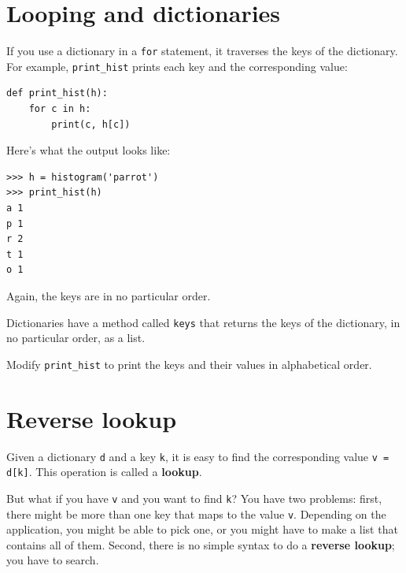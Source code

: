 \documentclass[10pt]{book}
\begin{document}
\section{Looping and dictionaries}


If you use a dictionary in a {\tt for} statement, it traverses
the keys of the dictionary.  For example, \verb"print_hist"
prints each key and the corresponding value:

\beforeverb
\begin{verbatim}
def print_hist(h):
    for c in h:
        print(c, h[c])
\end{verbatim}
\afterverb
%
Here's what the output looks like:

\beforeverb
\begin{verbatim}
>>> h = histogram('parrot')
>>> print_hist(h)
a 1
p 1
r 2
t 1
o 1
\end{verbatim}
\afterverb
%
Again, the keys are in no particular order.

\begin{ex}


Dictionaries have a method called {\tt keys} that returns
the keys of the dictionary, in no particular order, as a list.

Modify \verb"print_hist" to print the keys and their values
in alphabetical order.
\end{ex}



\section{Reverse lookup}


Given a dictionary {\tt d} and a key {\tt k}, it is easy to
find the corresponding value {\tt v = d[k]}.  This operation
is called a {\bf lookup}.

But what if you have {\tt v} and you want to find {\tt k}?
You have two problems: first, there might be more than one
key that maps to the value {\tt v}.  Depending on the application,
you might be able to pick one, or you might have to make
a list that contains all of them.  Second, there is no
simple syntax to do a {\bf reverse lookup}; you have to search.
\end{document}
